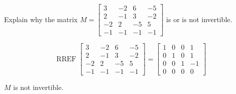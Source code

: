 
\begin{exerciseStatement}


Explain why the matrix \(M= \left[\begin{array}{cccc}
3 & -2 & 6 & -5 \\
2 & -1 & 3 & -2 \\
-2 & 2 & -5 & 5 \\
-1 & -1 & -1 & -1
\end{array}\right] \) is or is not invertible.


\end{exerciseStatement}
    
\begin{exerciseAnswer} 


\[\operatorname{RREF} \left[\begin{array}{cccc}
3 & -2 & 6 & -5 \\
2 & -1 & 3 & -2 \\
-2 & 2 & -5 & 5 \\
-1 & -1 & -1 & -1
\end{array}\right] = \left[\begin{array}{cccc}
1 & 0 & 0 & 1 \\
0 & 1 & 0 & 1 \\
0 & 0 & 1 & -1 \\
0 & 0 & 0 & 0
\end{array}\right] \]

\(M\) is not invertible.
\end{exerciseAnswer}
    
